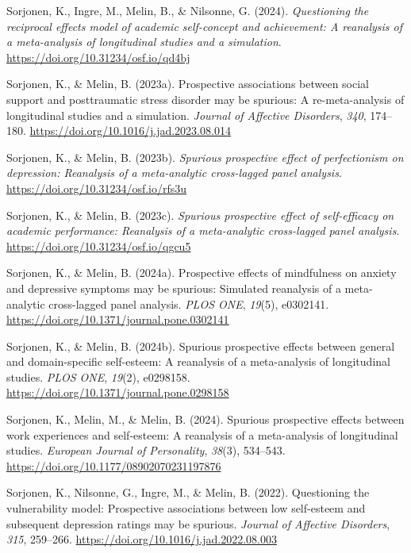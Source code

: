 \documentclass[
  man,mask,floatsintext]{apa6}
\newlength{\cslhangindent}
\newenvironment{CSLReferences}[2] %
 {\begin{list}{}{%
  \setlength{\itemindent}{0pt}
  \setlength{\leftmargin}{0pt}
  \setlength{\parsep}{0pt}
  \ifodd #1
   \setlength{\leftmargin}{\cslhangindent}
   \setlength{\itemindent}{-1\cslhangindent}
  \fi
  \setlength{\itemsep}{#2\baselineskip}}}
 {\end{list}}
\begin{document}
\begin{CSLReferences}{1}{0}
Sorjonen, K., Ingre, M., Melin, B., \& Nilsonne, G. (2024). \emph{Questioning the reciprocal effects model of academic self-concept and achievement: {A} reanalysis of a meta-analysis of longitudinal studies and a simulation}. \url{https://doi.org/10.31234/osf.io/qd4bj}

Sorjonen, K., \& Melin, B. (2023a). Prospective associations between social support and posttraumatic stress disorder may be spurious: {A} re-meta-analysis of longitudinal studies and a simulation. \emph{Journal of Affective Disorders}, \emph{340}, 174--180. \url{https://doi.org/10.1016/j.jad.2023.08.014}

Sorjonen, K., \& Melin, B. (2023b). \emph{Spurious prospective effect of perfectionism on depression: {Reanalysis} of a meta-analytic cross-lagged panel analysis}. \url{https://doi.org/10.31234/osf.io/rfs3u}

Sorjonen, K., \& Melin, B. (2023c). \emph{Spurious prospective effect of self-efficacy on academic performance: {Reanalysis} of a meta-analytic cross-lagged panel analysis}. \url{https://doi.org/10.31234/osf.io/qgcu5}

Sorjonen, K., \& Melin, B. (2024a). Prospective effects of mindfulness on anxiety and depressive symptoms may be spurious: {Simulated} reanalysis of a meta-analytic cross-lagged panel analysis. \emph{PLOS ONE}, \emph{19}(5), e0302141. \url{https://doi.org/10.1371/journal.pone.0302141}

Sorjonen, K., \& Melin, B. (2024b). Spurious prospective effects between general and domain-specific self-esteem: {A} reanalysis of a meta-analysis of longitudinal studies. \emph{PLOS ONE}, \emph{19}(2), e0298158. \url{https://doi.org/10.1371/journal.pone.0298158}

Sorjonen, K., Melin, M., \& Melin, B. (2024). Spurious prospective effects between work experiences and self-esteem: {A} reanalysis of a meta-analysis of longitudinal studies. \emph{European Journal of Personality}, \emph{38}(3), 534--543. \url{https://doi.org/10.1177/08902070231197876}

Sorjonen, K., Nilsonne, G., Ingre, M., \& Melin, B. (2022). Questioning the vulnerability model: {Prospective} associations between low self-esteem and subsequent depression ratings may be spurious. \emph{Journal of Affective Disorders}, \emph{315}, 259--266. \url{https://doi.org/10.1016/j.jad.2022.08.003}


\end{CSLReferences}
\end{document}
